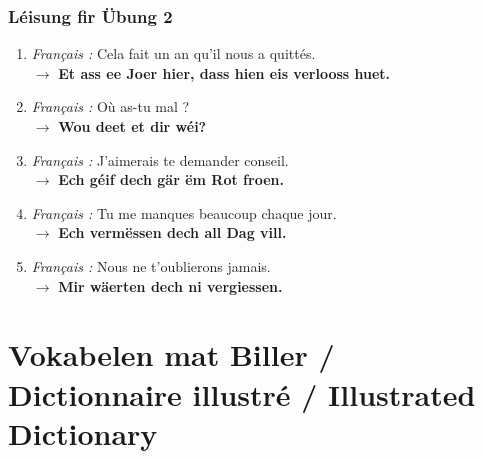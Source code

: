 \subsubsection*{Léisung fir Übung 2}
\begin{enumerate}
    \item \textit{Français :} Cela fait un an qu'il nous a quittés. \\
    $\rightarrow$ \textbf{Et ass ee Joer hier, dass hien eis verlooss huet.}

    \item \textit{Français :} Où as-tu mal ? \\
    $\rightarrow$ \textbf{Wou deet et dir wéi?}

    \item \textit{Français :} J'aimerais te demander conseil. \\
    $\rightarrow$ \textbf{Ech géif dech gär ëm Rot froen.}

    \item \textit{Français :} Tu me manques beaucoup chaque jour. \\
    $\rightarrow$ \textbf{Ech vermëssen dech all Dag vill.}

    \item \textit{Français :} Nous ne t'oublierons jamais. \\
    $\rightarrow$ \textbf{Mir wäerten dech ni vergiessen.}
\end{enumerate}

\vspace{2em}

\section[Vokabelen mat Biller / Picture Dictionary]{Vokabelen mat Biller / Dictionnaire illustré / Illustrated Dictionary}

